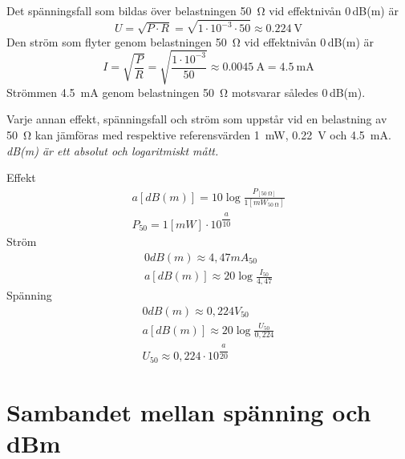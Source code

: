 Det spänningsfall som bildas över belastningen \qty{50}{\ohm} vid effektnivån
0\,dB(m) är
\[U = \sqrt{P\cdot R} = \sqrt{1\cdot 10^{-3} \cdot 50} \approx \qty{0,224}{\volt}\]
Den ström som flyter genom belastningen \qty{50}{\ohm} vid effektnivån 0\,dB(m)
är
\[
I = \sqrt{\frac{P}{R}} = \sqrt{\frac{1\cdot 10^{-3}}{50}} \approx \qty{0,0045}{\ampere} = \qty{4,5}{\milli\ampere}
\]
Strömmen \qty{4,5}{\milli\ampere} genom belastningen \qty{50}{\ohm} motsvarar
således 0\,dB(m).

Varje annan effekt, spänningsfall och ström som uppstår vid en belastning av
\qty{50}{\ohm} kan jämföras med respektive referensvärden \qty{1}{\milli\watt},
\qty{0,22}{\volt} och \qty{4,5}{\milli\ampere}.
\emph{dB(m) är ett absolut och logaritmiskt mått.}

\vspace*{1ex}
\noindent
Effekt
\begin{gather*}
	a [dB(m)] = 10 \log\frac{P_{[\qty{50}{\ohm}]}}{1[mW_{\qty{50}{\ohm}}]} \\
	P_{50} = 1 [mW] \cdot 10^{\dfrac{a}{10}}
\end{gather*}
Ström
\begin{gather*}
	0 dB(m) \approx 4,47 mA_{50} \\
	a [dB(m)] \approx 20 \log\frac{I_{50}}{4,47}
\end{gather*}
Spänning
\begin{gather*}
	0 dB(m) \approx 0,224 V_{50} \\
	a [dB(m)] \approx 20 \log\frac{U_{50}}{0,224} \\
	U_{50} \approx 0,224 \cdot 10^{\dfrac{a}{20}}
\end{gather*}

\section[Sambandet spänning och dBm]{Sambandet mellan spänning och dBm}

